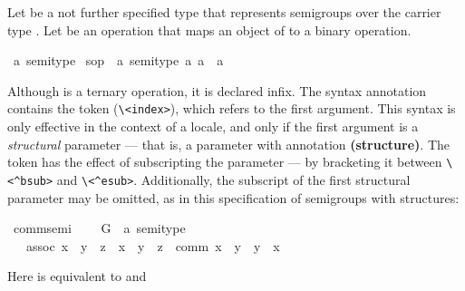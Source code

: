 \begin{isabellebody}
\begin{isamarkuptext}
  Let  be a not further specified type that
  represents semigroups over the carrier type .  Let  be an operation that maps an object of  to
  a binary operation.%
\end{isamarkuptext}%
\isamarkupfalse%
\ {\isacharprime}a\ semi{\isacharunderscore}type\isanewline
\isamarkupfalse%
\ s{\isacharunderscore}op\ {\isacharcolon}{\isacharcolon}\ {\isachardoublequote}{\isacharbrackleft}{\isacharprime}a\ semi{\isacharunderscore}type{\isacharcomma}\ {\isacharprime}a{\isacharcomma}\ {\isacharprime}a{\isacharbrackright}\ {\isasymRightarrow}\ {\isacharprime}a{\isachardoublequote}\ {\isacharparenleft}\ {\isachardoublequote}{\isasymstar}{\isasymindex}{\isachardoublequote}\ {}{}{\isacharparenright}\isamarkuptrue%
%
\begin{isamarkuptext}%
Although  is a ternary operation, it is declared
  infix.  The syntax annotation contains the token  \isa{{\isasymindex}}
  (\verb.\<index>.), which refers to the first argument.  This syntax is only
  effective in the context of a locale, and only if the first argument
  is a
  \emph{structural} parameter --- that is, a parameter with annotation
  \textbf{(structure)}.  The token has the effect of subscripting the
  parameter --- by bracketing it between \verb.\<^bsub>. and  \verb.\<^esub>..
  Additionally, the subscript of the first structural parameter may be
  omitted, as in this specification of semigroups with structures:%
\end{isamarkuptext}%
\isamarkupfalse%
\ comm{\isacharunderscore}semi{\isacharprime}\ {\isacharequal}\isanewline
\ \ \ G\ {\isacharcolon}{\isacharcolon}\ {\isachardoublequote}{\isacharprime}a\ semi{\isacharunderscore}type{\isachardoublequote}\ {\isacharparenleft}\isanewline
\ \ \ assoc{\isacharcolon}\ {\isachardoublequote}{\isacharparenleft}x\ {\isasymstar}\ y{\isacharparenright}\ {\isasymstar}\ z\ {\isacharequal}\ x\ {\isasymstar}\ {\isacharparenleft}y\ {\isasymstar}\ z{\isacharparenright}{\isachardoublequote}\ \ comm{\isacharcolon}\ {\isachardoublequote}x\ {\isasymstar}\ y\ {\isacharequal}\ y\ {\isasymstar}\ x{\isachardoublequote}\isamarkuptrue%
%
\begin{isamarkuptext}%
Here  is equivalent to  and

\end{isamarkuptext}
\end{isabellebody}

